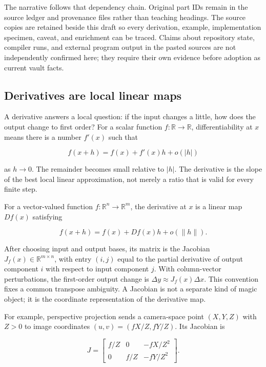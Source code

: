 The narrative follows that dependency chain. Original part IDs remain in the source ledger and provenance files rather than teaching headings. The source copies are retained beside this draft so every derivation, example, implementation specimen, caveat, and enrichment can be traced. Claims about repository state, compiler runs, and external program output in the pasted sources are not independently confirmed here; they require their own evidence before adoption as current vault facts.

\subsection{Derivatives are local linear maps}\label{01-foundations-i-ch020-derivatives-are-local-linear-maps}

\hypertarget{01-foundations-i-ch020-derivatives-are-local-linear-maps}{}

A derivative answers a local question: if the input changes a little, how does the output change to first order? For a scalar function \(f:\mathbb R\to\mathbb R\), differentiability at \(x\) means there is a number \(f'(x)\) such that

\[
f(x+h)=f(x)+f'(x)h+o(|h|)
\]

as \(h\to0\). The remainder becomes small relative to \(|h|\). The derivative is the slope of the best local linear approximation, not merely a ratio that is valid for every finite step.

For a vector-valued function \(f:\mathbb R^n\to\mathbb R^m\), the derivative at \(x\) is a linear map \(Df(x)\) satisfying

\[
f(x+h)=f(x)+Df(x)h+o(\|h\|).
\]

After choosing input and output bases, its matrix is the Jacobian \(J_f(x)\in\mathbb R^{m\times n}\), with entry \((i,j)\) equal to the partial derivative of output component \(i\) with respect to input component \(j\). With column-vector perturbations, the first-order output change is \(\Delta y\approx J_f(x)\Delta x\). This convention fixes a common transpose ambiguity. A Jacobian is not a separate kind of magic object; it is the coordinate representation of the derivative map.

For example, perspective projection sends a camera-space point \((X,Y,Z)\) with \(Z>0\) to image coordinates \((u,v)=(fX/Z,fY/Z)\). Its Jacobian is

\[
J=\begin{bmatrix}
f/Z & 0 & -fX/Z^2\\
0 & f/Z & -fY/Z^2
\end{bmatrix}.
\]


